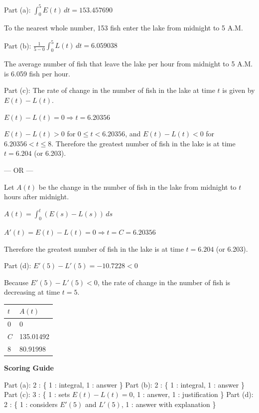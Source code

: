 \documentclass[12pt,addpoints,answers]{exam}
\begin{document}
\begin{questions}
\begin{solution}
Part (a): $\int_0^5 E(t)\,dt = 153.457690$ \par To the nearest whole number, 153 fish enter the lake from midnight to 5 A.M. \par Part (b): $\frac{1}{5-0}\int_0^5 L(t)\,dt = 6.059038$ \par The average number of fish that leave the lake per hour from midnight to 5 A.M. is 6.059 fish per hour. \par Part (c): The rate of change in the number of fish in the lake at time $t$ is given by $E(t) - L(t)$. \par $E(t) - L(t) = 0 \Rightarrow t = 6.20356$ \par $E(t) - L(t) > 0$ for $0 \le t < 6.20356$, and $E(t) - L(t) < 0$ for $6.20356 < t \le 8$. Therefore the greatest number of fish in the lake is at time $t = 6.204$ (or 6.203). \par — OR — \par Let $A(t)$ be the change in the number of fish in the lake from midnight to $t$ hours after midnight. \par $A(t) = \int_0^t (E(s) - L(s))\,ds$ \par $A'(t) = E(t) - L(t) = 0 \Rightarrow t = C = 6.20356$ \par Therefore the greatest number of fish in the lake is at time $t = 6.204$ (or 6.203). \par Part (d): $E'(5) - L'(5) = -10.7228 < 0$ \par Because $E'(5) - L'(5) < 0$, the rate of change in the number of fish is decreasing at time $t = 5$.
\begin{center}
\begin{tabular}{|l|l|}
\hline
$t$ & $A(t)$ \\
\hline
0 & 0 \\
\hline
$C$ & 135.01492 \\
\hline
8 & 80.91998 \\
\hline
\end{tabular}
\end{center}
\par\medskip
\textbf{Scoring Guide}\par
Part (a): 2 : \{ 1 : integral, 1 : answer \} Part (b): 2 : \{ 1 : integral, 1 : answer \} Part (c): 3 : \{ 1 : sets $E(t) - L(t) = 0$, 1 : answer, 1 : justification \} Part (d): 2 : \{ 1 : considers $E'(5)$ and $L'(5)$, 1 : answer with explanation \}
\end{solution}


\end{questions}
\end{document}
